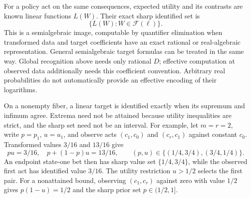 \documentclass[11pt]{article}
\begin{document}
For a policy act on the same consequences, expected utility and its contrasts are known linear functions $L(W)$. Their exact sharp identified set is
\[
 \{L(W):W\in\mathcal F(\ell)\}.
\]
This is a semialgebraic image, computable by quantifier elimination when transformed data and target coefficients have an exact rational or real-algebraic representation. General semialgebraic target formulas can be treated in the same way. Global recognition above needs only rational $D$; effective computation at observed data additionally needs this coefficient convention. Arbitrary real probabilities do not automatically provide an effective encoding of their logarithms.

On a nonempty fiber, a linear target is identified exactly when its supremum and infimum agree. Extrema need not be attained because utility inequalities are strict, and the sharp set need not be an interval. For example, let $m=r=2$, write $p=p_1$, $u=u_1$, and observe acts $(c_1,c_0)$ and $(c_r,c_1)$ against constant $c_0$. Transformed values $3/16$ and $13/16$ give
\[
 pu=3/16,\quad p+(1-p)u=13/16,
 \qquad (p,u)\in\{(1/4,3/4),(3/4,1/4)\}.
\]
An endpoint state-one bet then has sharp value set $\{1/4,3/4\}$, while the observed first act has identified value $3/16$. The utility restriction $u>1/2$ selects the first pair. For a nonattained bound, observing $(c_1,c_r)$ against zero with value $1/2$ gives $p(1-u)=1/2$ and the sharp prior set $p\in(1/2,1]$.
\end{document}
